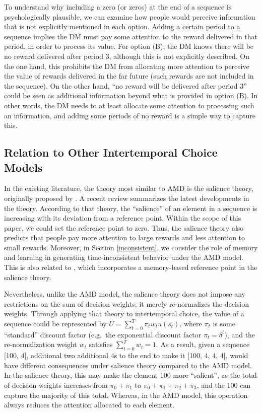 \documentclass[
  12pt,
]{article}
\begin{document}
To understand why including a zero (or zeros) at the end of a sequence
is psychologically plausible, we can examine how people would perceive
information that is not explicitly mentioned in each option. Adding a
certain period to a sequence implies the DM must pay some attention to
the reward delivered in that period, in order to process its value. For
option (B), the DM knows there will be no reward delivered after period
3, although this is not explicitly described. On the one hand, this
prohibits the DM from allocating more attention to perceive the value of
rewards delivered in the far future (such rewards are not included in
the sequence). On the other hand, ``no reward will be delivered after
period 3'' could be seen as additional information beyond what is
provided in option (B). In other words, the DM needs to at least
allocate some attention to processing such an information, and adding
some periods of no reward is a simple way to capture this.

\hypertarget{relation-to-other-intertemporal-choice-models}{%
\subsection{\texorpdfstring{Relation to Other Intertemporal Choice
Models
\label{relation_to_other}}{Relation to Other Intertemporal Choice Models }}\label{relation-to-other-intertemporal-choice-models}}

In the existing literature, the theory most similar to AMD is the
salience theory, originally proposed by \citet{bordalo2012salience}. A
recent review \citep{bordalo2022salience} summarizes the latest
developments in the theory. According to that theory, the ``salience''
of an element in a sequence is increasing with its deviation from a
reference point. Within the scope of this paper, we could set the
reference point to zero. Thus, the salience theory also predicts that
people pay more attention to large rewards and less attention to small
rewards. Moreover, in Section \ref{inconsistent}, we consider the role
of memory and learning in generating time-inconsistent behavior under
the AMD model. This is also related to \citet{bordalo2020memory}, which
incorporates a memory-based reference point in the salience theory.

Nevertheless, unlike the AMD model, the salience theory does not impose
any restrictions on the sum of decision weights; it merely re-normalizes
the decision weights. Through applying that theory to intertemporal
choice, the value of a sequence could be represented by
\(U=\sum_{t=0}^T \pi_tw_tu(s_t)\), where \(\pi_t\) is some ``standard''
discount factor (e.g.~the exponential discount factor
\(\pi_t=\delta^t\)), and the re-normalization weight \(w_t\) satisfies
\(\sum_{t=0}^T w_t=1\). As a result, given a sequence {[}100, 4{]},
additional two additional 4s to the end to make it {[}100, 4, 4, 4{]},
would have different consequences under salience theory compared to the
AMD model. In the salience theory, this may make the element 100 more
``salient'', as the total of decision weights increases from
\(\pi_0 + \pi_1\) to \(\pi_0 + \pi_1 + \pi_2 + \pi_3\), and the 100 can
capture the majority of this total. Whereas, in the AMD model, this
operation always reduces the attention allocated to each element.
\end{document}
